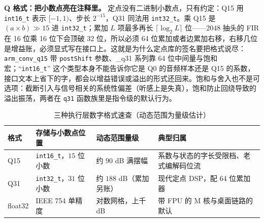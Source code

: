 \documentclass[12pt,a4paper,fontset=fandol]{ctexbook}
\newcommand{\Tp}[1]{\texttt{#1}}
\begin{document}
\textbf{Q 格式：把小数点亮在注释里。} 定点没有二进制小数点，只有约定：Q15 用 \Tp{int16\_t} 表示 $[-1,1)$、步长 $2^{-15}$，Q31 同法用 \Tp{int32\_t}。乘 Q15 是 $(a \times b) \gg 15$ 进 \Tp{int32\_t}；累加 $L$ 项最多再长 $\lceil \log_2 L \rceil$ 位——$2048$ 抽头的 FIR 在 16 位乘 16 位下会顶破 32 位，所以必须 64 位累加或者边累加右移，右移几位是增益账，必须显式写在接口上。这就是为什么定点库的签名要把格式说尽：\Tp{arm\_conv\_q15} 带 \Tp{postShift} 参数、\_q31 系列靠 64 位中间量与饱和宏；``\Tp{int16\_t}'' 这个类型本身不能告诉你它是 Q0 的音频样本还是 Q15 的系数，接口文本上省下的字，都会以增益错误或溢出的形式还回来。饱和与舍入也不是可选项：截断引入与信号相关的系统性偏差（听感上是失真），饱和防止回绕导致的溢出振荡，两者在 \Tp{q31} 函数族里是指令级的默认行为。

\begin{table}[H]
\centering
\caption{三种执行层数字格式速查（动态范围为量级估计）}
\label{tab:ch13-formats}
\small
\begin{tabular}{@{}>{\raggedright\arraybackslash}p{}
  >{\raggedright\arraybackslash}p{}
  >{\raggedright\arraybackslash}p{}
  >{\raggedright\arraybackslash}p{}@{}}
\toprule
格式 & 存储与小数点位置 & 动态范围量级 & 典型归属 \\
\midrule
Q15 & \Tp{int16\_t}，$15$ 位小数 &
  约 $90$ dB 满摆幅 &
  系数与状态的字长受限档、老式编解码位流 \\
Q31 & \Tp{int32\_t}，$31$ 位小数 &
  约 $188$ dB（累加另账） &
  现代定点 DSP，配 $64$ 位累加器 \\
float32 & IEEE 754 单精度 &
  对数网格，上千 dB &
  带 FPU 的 M 核与桌面链路的默认 \\
\bottomrule
\end{tabular}
\end{table}
\end{document}
